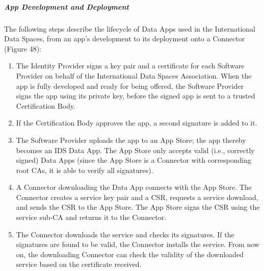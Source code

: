 
\subparagraph*{App Development and Deployment \\}
The following steps describe the lifecycle of Data Apps used in the International Data Spaces, from an app’s development to its deployment onto a Connector (Figure 48):

\begin{enumerate}[label*=\arabic*.]
	\item The Identity Provider signs a key pair and a certificate for each Software Provider on behalf of the International Data Spaces Association. When the app is fully developed and ready for being offered, the Software Provider signs the app using its private key, before the signed app is sent to a trusted Certification Body.

	\item If the Certification Body approves the app, a second signature is added to it.

	\item The Software Provider uploads the app to an App Store; the app thereby becomes an IDS Data App. The App Store only accepts valid (i.e., correctly signed) Data Apps (since the App Store is a Connector with corresponding root CAs, it is able to verify all signatures).

	\item A Connector downloading the Data App connects with the App Store. The Connector creates a service key pair and a CSR, requests a service download, and sends the CSR to the App Store. The App Store signs the CSR using the service sub-CA and returns it to the Connector.

	\item The Connector downloads the service and checks its signatures. If the signatures are found to be valid, the Connector installs the service. From now on, the downloading Connector can check the validity of the downloaded service based on the certificate received.
\end{enumerate}





